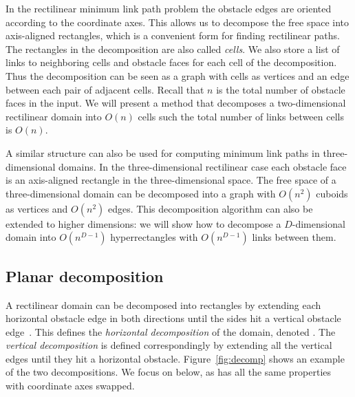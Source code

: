 \documentclass[english,gradu]{tktltiki2018}
\begin{document}
In the rectilinear minimum link path problem the obstacle edges are oriented according to the coordinate axes.
This allows us to decompose the free space into axis-aligned rectangles, which is a convenient form for finding rectilinear paths.
The rectangles in the decomposition are also called \emph{cells}.
We also store a list of links to neighboring cells and obstacle faces for each cell of the decomposition.
Thus the decomposition can be seen as a graph with cells as vertices and an edge between each pair of adjacent cells.
Recall that $n$ is the total number of obstacle faces in the input.
We will present a method that decomposes a two-dimensional rectilinear domain into $O(n)$ cells such the total number of links between cells is $O(n)$.

A similar structure can also be used for computing minimum link paths in three-dimensional domains.
In the three-dimensional rectilinear case each obstacle face is an axis-aligned rectangle in the three-dimensional space.
The free space of a three-dimensional domain can be decomposed into a graph with $O(n^2)$ cuboids as vertices and $O(n^2)$ edges.
This decomposition algorithm can also be extended to higher dimensions:
we will show how to decompose a $D$-dimensional domain into $O(n^{D-1})$ hyperrectangles with $O(n^{D-1})$ links between them.

\subsection{Planar decomposition}\label{sec:decomp2d}

A rectilinear domain can be decomposed into rectangles by extending each horizontal obstacle edge in both directions until the sides hit a vertical obstacle edge~\cite{imai86}.
This defines the \emph{horizontal decomposition} of the domain, denoted .
The \emph{vertical decomposition}  is defined correspondingly by extending all the vertical edges until they hit a horizontal obstacle.
Figure~\ref{fig:decomp} shows an example of the two decompositions.
We focus on  below, as  has all the same properties with coordinate axes swapped.
\end{document}
